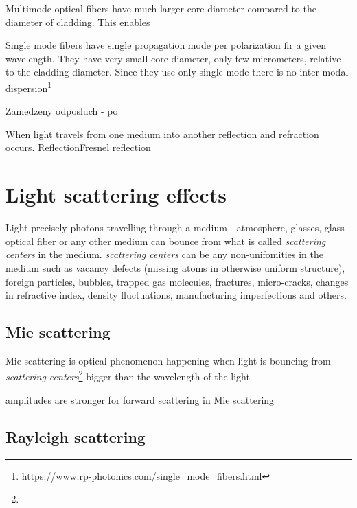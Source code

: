 Multimode optical fibers have much larger core diameter compared to the diameter of cladding. This enables 


Single mode fibers have single propagation mode  per polarization fir a given wavelength. They have very small core diameter, only few micrometers, relative to the cladding diameter. Since they use only single mode there is no inter-modal dispersion\footnote{https://www.rp-photonics.com/single\_mode\_fibers.html}






Zamedzeny odposluch - po

When light travels from one medium into another reflection and refraction occurs. ReflectionFresnel reflection 




\section{Light scattering effects}

Light precisely photons travelling through a medium - atmosphere, glasses, glass optical fiber or any other medium can bounce from what is called \textit{scattering centers} in the medium. \textit{scattering centers} can be any non-unifomities in the medium such as vacancy defects (missing atoms in otherwise uniform structure), foreign particles, bubbles, trapped gas molecules, fractures, micro-cracks, changes in refractive index, density fluctuations, manufacturing imperfections and others\cite{scatteringcenterbook}.



\label{miesctt}
\subsection{Mie scattering}

Mie scattering is optical phenomenon happening when light is bouncing from \textit{scattering centers}\footnote{} bigger than the wavelength of the light

 amplitudes are stronger for forward scattering in Mie scattering


\subsection{Rayleigh scattering}

